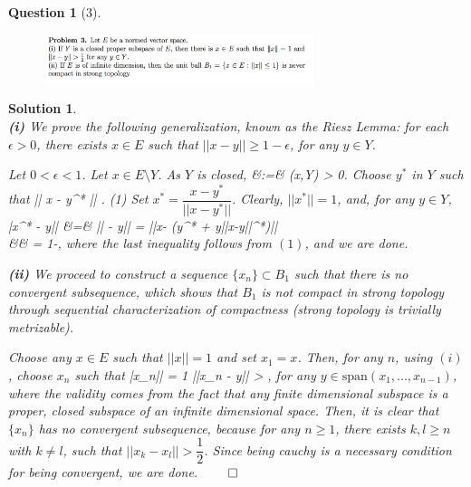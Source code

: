 \documentclass{article} %
\def\eQb#1\eQe{\begin{eqnarray*}#1\end{eqnarray*}}
\theoremstyle{quest}
\newtheorem*{question}{Question}
\newtheorem*{solution}{Solution}
\begin{document}
\begin{question}[3]
\hfill
\begin{figure}[h!]
  \centering
    \includegraphics[width=0.7\textwidth]{funcA-h-e1-p3.png}
\end{figure}
\end{question}
\begin{solution} \hfill \\
\textbf{(i)} We prove the following generalization, known as the Riesz Lemma:
for each $\epsilon > 0$, there exists $x \in E$ such that $||x - y|| 
\geq 1 - \epsilon$, for any $y \in Y$. 

\smallskip

Let $0 < \epsilon < 1$. Let $x \in E\setminus Y$. As $Y$ is closed,
\eQb
d &:=& (x,Y) > 0.
\eQe
Choose $y^*$ in $Y$ such that 
\eQb
d \leq || x - y^* || \leq {}. \>\>\> (1)
\eQe
Set $x^* = \dfrac{x-y^*}{||x-y^*||}$. Clearly, $||x^*|| = 1$, and,
for any $y \in Y$,
\eQb
||x^* - y|| &=& || - y|| = 
||x- (y^* + y||x-y||^*)|| \\
&\geq&   = 1-\epsilon, 
\eQe 
where the last inequality follows from $(1)$, and we are done.  

\bigskip

\textbf{(ii)} We proceed to construct a sequence $\{x_n\} \subset B_1$ 
such that there is no convergent subsequence, which shows that $B_1$ is not
compact in strong topology through sequential characterization of compactness
(strong topology is trivially metrizable). 

\smallskip
Choose any $x \in E$ such that $||x|| = 1$ and set $x_1 = x$. 
Then, for any $n$, using $(i)$, 
choose $x_n$ such that 
\eQb
||x_n|| = 1 \>\>   \>\> ||x_n - y|| > , 
\eQe
for any $y \in \text{span}(x_1,...,x_{n-1})$, where the validity comes from
the fact that any finite dimensional subspace is a proper, closed subspace
of an infinite dimensional space. Then, it is clear that $\{x_n\}$ has no
convergent subsequence, because for any $n \geq 1$, there exists $k, l \geq n$
with $k \neq l$, such that $||x_k - x_l|| > \dfrac{1}{2}$. Since being cauchy
is a necessary condition for being convergent, we are done. 
\hfill $\qed$ 

\end{solution}
\end{document}
